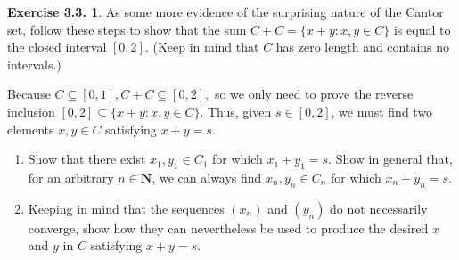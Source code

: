 \documentclass[12pt]{article}
\theoremstyle{definition}
\theoremstyle{exercise}
\newtheorem{exercise}{Exercise 3.3.}
\theoremstyle{solution}
\newcommand{\N}{\mathbf{N}}
\begin{document}
\begin{exercise}
\label{ex:7}
    As some more evidence of the surprising nature of the Cantor set, follow these steps to show that the sum \( C + C = \{ x + y : x, y \in C \} \) is equal to the closed interval \( [0, 2] \). (Keep in mind that \( C \) has zero length and contains no intervals.)

    Because \( C \subseteq [0, 1], C + C \subseteq [0, 2], \) so we only need to prove the reverse inclusion \( [0, 2] \subseteq \{ x + y : x, y \in C \} \). Thus, given \( s \in [0, 2] \), we must find two elements \( x, y \in C \) satisfying \( x + y = s \).
    \begin{enumerate}
        \item Show that there exist \( x_1, y_1 \in C_1 \) for which \( x_1 + y_1 = s \). Show in general that, for an arbitrary \( n \in \N \), we can always find \( x_n, y_n \in C_n \) for which \( x_n + y_n = s \).

        \item Keeping in mind that the sequences \( (x_n) \) and \( (y_n) \) do not necessarily converge, show how they can nevertheless be used to produce the desired \( x \) and \( y \) in \( C \) satisfying \( x + y = s \).
    \end{enumerate}
\end{exercise}
\end{document}
